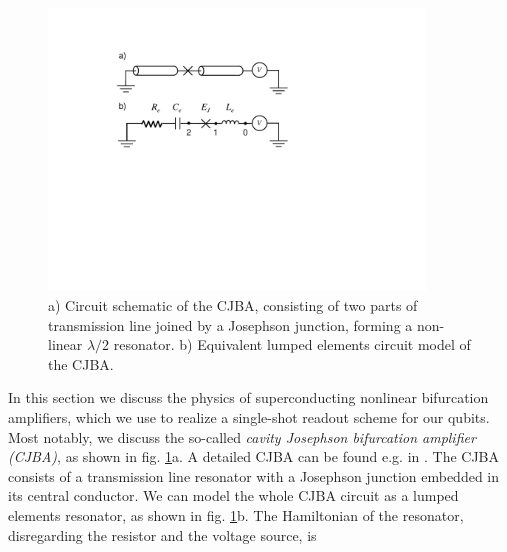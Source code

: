 \begin{figure}
	\includegraphics[width=10cm]{"./material/figures/introduction/jba"}
	\caption{a) Circuit schematic of the CJBA, consisting of two parts of transmission line joined by a Josephson junction, forming a non-linear $\lambda/2$ resonator. b) Equivalent lumped elements circuit model of the CJBA.}
	\label{fig:cba_schematic}
\end{figure}

In this section we discuss the physics of superconducting nonlinear bifurcation amplifiers, which we use to realize a single-shot readout scheme for our qubits. Most notably, we discuss the so-called {\it cavity Josephson bifurcation amplifier (CJBA)}, as shown in fig. \ref{fig:cba_schematic}a. A detailed CJBA can be found e.g. in \cite{palacios-laloy_superconducting_2010}. The CJBA consists of a transmission line resonator with a Josephson junction embedded in its central conductor. We can model the whole CJBA circuit as a lumped elements resonator, as shown in fig. \ref{fig:cba_schematic}b. The Hamiltonian of the resonator, disregarding the resistor and the voltage source, is

